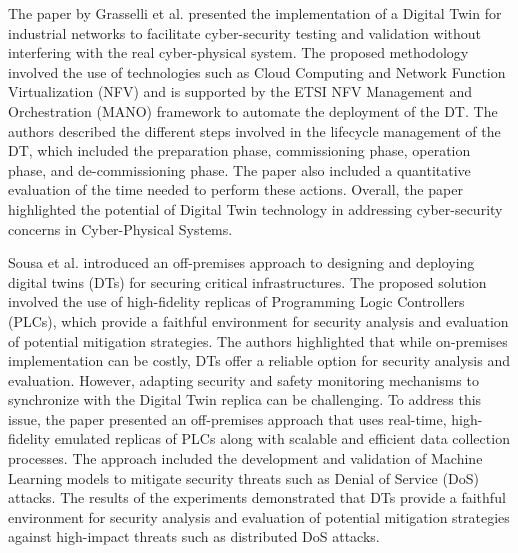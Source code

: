 The paper by Grasselli et al.\cite{grasselliIndustrialNetworkDigital2022} presented the implementation of a Digital Twin for industrial networks to facilitate cyber-security testing and validation without interfering with the real cyber-physical system. The proposed methodology involved the use of technologies such as Cloud Computing and Network Function Virtualization (NFV) and is supported by the ETSI NFV Management and Orchestration (MANO) framework to automate the deployment of the DT. The authors described the different steps involved in the lifecycle management of the DT, which included the preparation phase, commissioning phase, operation phase, and de-commissioning phase. The paper also included a quantitative evaluation of the time needed to perform these actions. Overall, the paper highlighted the potential of Digital Twin technology in addressing cyber-security concerns in Cyber-Physical Systems.




Sousa et al.\cite{sousaELEGANTSecurityCritical2021} introduced an off-premises approach to designing and deploying digital twins (DTs) for securing critical infrastructures. The proposed solution involved the use of high-fidelity replicas of Programming Logic Controllers (PLCs), which provide a faithful environment for security analysis and evaluation of potential mitigation strategies. The authors highlighted that while on-premises implementation can be costly, DTs offer a reliable option for security analysis and evaluation. However, adapting security and safety monitoring mechanisms to synchronize with the Digital Twin replica can be challenging. To address this issue, the paper presented an off-premises approach that uses real-time, high-fidelity emulated replicas of PLCs along with scalable and efficient data collection processes. The approach included the development and validation of Machine Learning models to mitigate security threats such as Denial of Service (DoS) attacks. The results of the experiments demonstrated that DTs provide a faithful environment for security analysis and evaluation of potential mitigation strategies against high-impact threats such as distributed DoS attacks.

